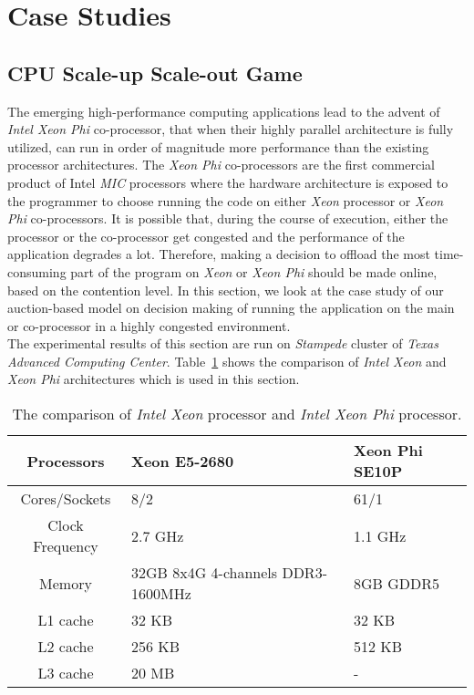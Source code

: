 \section{Case Studies} \label{Case_Studies}
\subsection{CPU Scale-up Scale-out Game}
The emerging high-performance computing applications lead to the advent of \textit{Intel Xeon Phi} co-processor, that when their highly parallel architecture is fully utilized, can run in order of magnitude more performance than the existing processor architectures. The \textit{Xeon Phi} co-processors are the first commercial product of Intel \textit{MIC} processors where the hardware architecture is exposed to the programmer to choose running the code on either \textit{Xeon} processor or \textit{Xeon Phi} co-processors. It is possible that, during the course of execution, either the processor or the co-processor get congested and the performance of the application degrades a lot. Therefore, making a decision to offload the most time-consuming part of the program on \textit{Xeon} or \textit{Xeon Phi} should be made online, based on the contention level.  In this section, we look at the case study of our auction-based model on decision making of running the application on the main or co-processor in a highly congested environment. \\
\indent The experimental results of this section are run on \textit{Stampede} cluster of \textit{Texas Advanced Computing Center}. Table~\ref{Table:Xeon} shows the comparison of \textit{Intel Xeon} and \textit{Xeon Phi} architectures which is used in this section. 
\begin{table}[!tb] 
\centering
\caption{The comparison of \textit{Intel Xeon} processor and \textit{Intel Xeon Phi} processor.}\label{Table:Xeon}
\begin{tabular}{|c|p{0.8in}|p{1in}|} 
\hline Processors & Xeon E5-2680 & Xeon Phi SE10P \\
\hline Cores/Sockets & 8/2 & 61/1 \\
\hline Clock Frequency & 2.7 GHz & 1.1 GHz  \\
\hline Memory & 32GB 8x4G 4-channels DDR3-1600MHz & 8GB GDDR5 \\
\hline L1 cache & 32 KB & 32 KB \\
\hline L2 cache & 256 KB & 512 KB \\
\hline L3 cache & 20 MB & - \\
\hline
\end{tabular}
\end{table}
